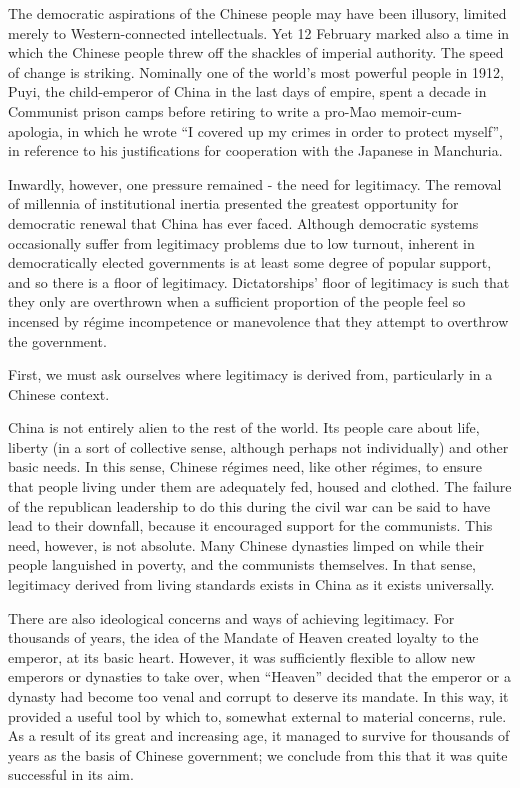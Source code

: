	The democratic aspirations of the Chinese people may have been illusory, limited merely to Western-connected intellectuals. Yet 12 February marked also a time in which the Chinese people threw off the shackles of imperial authority. The speed of change is striking. Nominally one of the world’s most powerful people in 1912, Puyi, the child-emperor of China in the last days of empire, spent a decade in Communist prison camps before retiring to write a pro-Mao memoir-cum-apologia, in which he wrote ``I covered up my crimes in order to protect myself”, in reference to his justifications for cooperation with the Japanese in Manchuria.

	Inwardly, however, one pressure remained - the need for legitimacy. The removal of millennia of institutional inertia presented the greatest opportunity for democratic renewal that China has ever faced. Although democratic systems occasionally suffer from legitimacy problems due to low turnout, inherent in democratically elected governments is at least some degree of popular support, and so there is a floor of legitimacy. Dictatorships' floor of legitimacy is such that they only are overthrown when a sufficient proportion of the people feel so incensed by régime incompetence or manevolence that they attempt to overthrow the government.

	First, we must ask ourselves where legitimacy is derived from, particularly in a Chinese context.

	China is not entirely alien to the rest of the world. Its people care about life, liberty (in a sort of collective sense, although perhaps not individually) and other basic needs. In this sense, Chinese régimes need, like other régimes, to ensure that people living under them are adequately fed, housed and clothed. The failure of the republican leadership to do this during the civil war can be said to have lead to their downfall, because it encouraged support for the communists. This need, however, is not absolute. Many Chinese dynasties limped on while their people languished in poverty, and the communists themselves. In that sense, legitimacy derived from living standards exists in China as it exists universally.

	There are also ideological concerns and ways of achieving legitimacy. For thousands of years, the idea of the Mandate of Heaven created loyalty to the emperor, at its basic heart. However, it was sufficiently flexible to allow new emperors or dynasties to take over, when ``Heaven'' decided that the emperor or a dynasty had become too venal and corrupt to deserve its mandate. In this way, it provided a useful tool by which to, somewhat external to material concerns, rule. As a result of its great and increasing age, it managed to survive for thousands of years as the basis of Chinese government; we conclude from this that it was quite successful in its aim.

